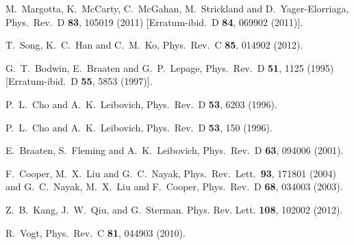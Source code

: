 \documentclass[article,showpacs,preprintnumbers,amsmath,amssymb]{revtex4}
\begin{document}
\begin{thebibliography}{80}
  M.~Margotta, K.~McCarty, C.~McGahan, M.~Strickland and D.~Yager-Elorriaga,
  Phys.\ Rev.\ D {\bf 83}, 105019 (2011)
   [Erratum-ibid.\ D {\bf 84}, 069902 (2011)].

  T.~Song, K.~C.~Han and C.~M.~Ko,
  Phys.\ Rev.\ C {\bf{85}}, 014902 (2012).

  G.~T.~Bodwin, E.~Braaten and G.~P.~Lepage,
  Phys.\ Rev.\  D {\bf 51}, 1125 (1995)
  [Erratum-ibid.\  D {\bf 55}, 5853 (1997)].


  P.~L.~Cho and A.~K.~Leibovich,
  Phys.\ Rev.\  D {\bf 53}, 6203 (1996).

  P.~L.~Cho and A.~K.~Leibovich,
  Phys.\ Rev.\  D {\bf 53}, 150 (1996).

  E.~Braaten, S.~Fleming and A.~K.~Leibovich,
  Phys.\ Rev.\  D {\bf 63}, 094006 (2001).

  F.~Cooper, M.~X.~Liu and G.~C.~Nayak,
  Phys.\ Rev.\ Lett.\  {\bf 93}, 171801 (2004) and
  G.~C.~Nayak, M.~X.~Liu and F.~Cooper,
  Phys.\ Rev.\  D {\bf 68}, 034003 (2003).


  Z.~B.~Kang, J.~W.~Qiu, and G.~Sterman. 
 Phys. Rev. Lett. {\bf{108}}, 102002 (2012).

  R.~Vogt,
  Phys.\ Rev.\  C {\bf 81}, 044903 (2010).




\end{thebibliography}
\end{document}
